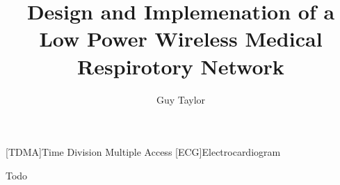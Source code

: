 \documentclass[bsc,logo,plainprepages,parskip,abbrevs,10pt]{infthesis}
\title{Design and Implemenation of a Low Power Wireless Medical Respirotory Network}
\author{Guy Taylor}
\begin{document}
\begin{acronym}
[TDMA]{Time Division Multiple Access}
[ECG]{Electrocardiogram}
\end{acronym}

\begin{preliminary}

\maketitle

\begin{acknowledgements}
  Todo
\end{acknowledgements}

\standarddeclaration

\tableofcontents

\listoffigures
\listoftables

\end{preliminary}






\appendix








\end{document}
